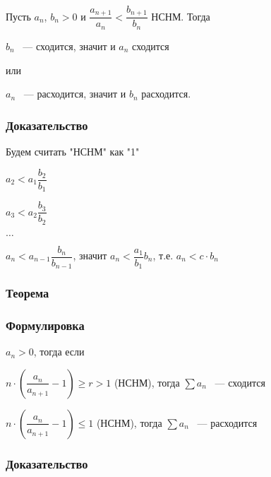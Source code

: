 \documentclass[../main.tex]{subfiles}
\begin{document}
                Пусть $a_n$, $b_n > 0$ и $\dfrac{a_{n + 1}}{a_n} < \dfrac{b_{n + 1}}{b_n}$ НСНМ. Тогда
                
                $b_n$ ~--- сходится, значит и $a_n$ сходится
                
                или
                
                $a_n$ ~--- расходится, значит и $b_n$ расходится.
                
            \subsubsection*{Доказательство}
            
                Будем считать "НСНМ" как "1"
                
                $a_2 < a_1 \dfrac{b_2}{b_1}$
                
                $a_3 < a_2 \dfrac{b_3}{b_2}$
                
                $\ldots$
                
                $a_n < a_{n - 1} \dfrac{b_n}{b_{n - 1}}$, значит $a_n < \dfrac{a_1}{b_1} b_n$, т.е. $a_n < c \cdot b_n$
        
        \subsubsection*{Теорема}
        
            \subsubsection*{Формулировка}
            
                $a_n > 0$, тогда если 
                
                $n \cdot \left( \dfrac{a_n}{a_{n + 1}} - 1 \right) \geq r > 1$ (НСНМ), тогда $\sum a_n$ ~--- сходится
                
                $n \cdot \left( \dfrac{a_n}{a_{n + 1}} - 1 \right) \leq 1$ (НСНМ), тогда $\sum a_n$ ~--- расходится
                
            \subsubsection*{Доказательство}
            
\end{document}
